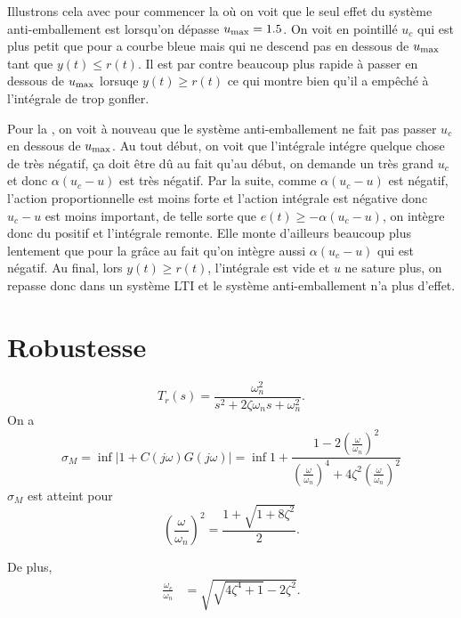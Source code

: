 Illustrons cela avec pour commencer la  où on voit que le seul effet du système anti-emballement est lorsqu'on dépasse
$u_\mathrm{max} = 1.5$.
On voit en pointillé $u_c$ qui est plus petit que pour a courbe bleue mais qui ne descend pas en dessous de $u_\mathrm{max}$ tant que $y(t) \leq r(t)$.
Il est par contre beaucoup plus rapide à passer en dessous de $u_\mathrm{max}$ lorsuqe $y(t) \geq r(t)$ ce qui montre bien qu'il a empêché à l'intégrale de trop gonfler.

Pour la , on voit à nouveau que le système anti-emballement ne fait pas passer $u_c$ en dessous de $u_\mathrm{max}$.
Au tout début, on voit que l'intégrale intégre quelque chose de très négatif, ça doit être dû au fait qu'au début, on demande un
très grand $u_c$ et donc $\alpha (u_c-u)$ est très négatif.
Par la suite, comme $\alpha(u_c-u)$ est négatif, l'action proportionnelle est moins forte et l'action intégrale est négative donc
$u_c - u$ est moins important, de telle sorte que $e(t) \geq -\alpha (u_c - u)$, on intègre donc du positif et l'intégrale remonte.
Elle monte d'ailleurs beaucoup plus lentement que pour la  grâce au fait qu'on intègre aussi $\alpha (u_c - u)$ qui
est négatif.
Au final, lors $y(t) \geq r(t)$, l'intégrale est vide et $u$ ne sature plus, on repasse donc dans un système LTI et le système
anti-emballement n'a plus d'effet.


\section{Robustesse}

\[ T_r(s) = \frac{\omega_n^2}{s^2 + 2 \zeta \omega_n s + \omega_n^2}. \]
On a
\[ \sigma_M = \inf \left|1 + C(j\omega)G(j\omega)\right| =
\inf 1 + \frac{1 - 2\left(\frac{\omega}{\omega_n}\right)^2}{\left(\frac{\omega}{\omega_n}\right)^4 + 4\zeta^2\left(\frac{\omega}{\omega_n}\right)^2} \]
$\sigma_M$ est atteint pour
\[ \left(\frac{\omega}{\omega_n}\right)^2 = \frac{1 + \sqrt{1 + 8\zeta^2}}{2}. \]

De plus,
\begin{align*}
  \frac{\omega_c}{\omega_n} & = \sqrt{\sqrt{4\zeta^4 + 1} - 2\zeta^2}.
\end{align*}

\biblio


